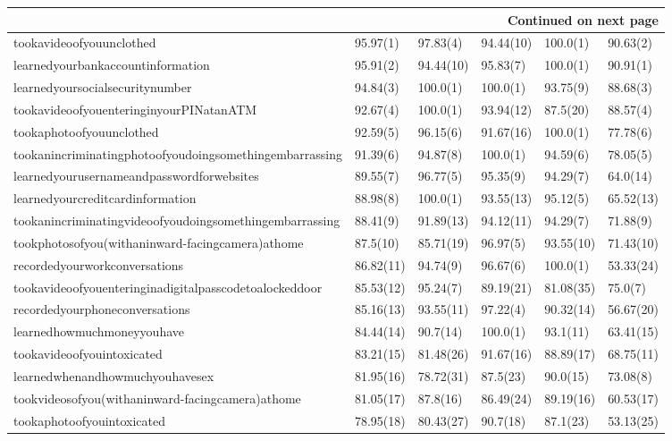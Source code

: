 \documentclass[a4paper,12pt]{article}
\begin{document}
\begin{longtable}{| p{7cm} | l | l | l | l | l |}
\hline \multicolumn{6}{|r|}{{Continued on next page}} \\ \hline
\endfoot
\hline 
\endlastfoot
tookavideoofyouunclothed & 95.97(1) & 97.83(4) & 94.44(10) & 100.0(1) & 90.63(2) \\ 
learnedyourbankaccountinformation & 95.91(2) & 94.44(10) & 95.83(7) & 100.0(1) & 90.91(1) \\ 
learnedyoursocialsecuritynumber & 94.84(3) & 100.0(1) & 100.0(1) & 93.75(9) & 88.68(3) \\ 
tookavideoofyouenteringinyourPINatanATM & 92.67(4) & 100.0(1) & 93.94(12) & 87.5(20) & 88.57(4) \\ 
tookaphotoofyouunclothed & 92.59(5) & 96.15(6) & 91.67(16) & 100.0(1) & 77.78(6) \\ 
tookanincriminatingphotoofyoudoingsomethingembarrassing & 91.39(6) & 94.87(8) & 100.0(1) & 94.59(6) & 78.05(5) \\ 
learnedyourusernameandpasswordforwebsites & 89.55(7) & 96.77(5) & 95.35(9) & 94.29(7) & 64.0(14) \\ 
learnedyourcreditcardinformation & 88.98(8) & 100.0(1) & 93.55(13) & 95.12(5) & 65.52(13) \\ 
tookanincriminatingvideoofyoudoingsomethingembarrassing & 88.41(9) & 91.89(13) & 94.12(11) & 94.29(7) & 71.88(9) \\ 
tookphotosofyou(withaninward-facingcamera)athome & 87.5(10) & 85.71(19) & 96.97(5) & 93.55(10) & 71.43(10) \\ 
recordedyourworkconversations & 86.82(11) & 94.74(9) & 96.67(6) & 100.0(1) & 53.33(24) \\ 
tookavideoofyouenteringinadigitalpasscodetoalockeddoor & 85.53(12) & 95.24(7) & 89.19(21) & 81.08(35) & 75.0(7) \\ 
recordedyourphoneconversations & 85.16(13) & 93.55(11) & 97.22(4) & 90.32(14) & 56.67(20) \\ 
learnedhowmuchmoneyyouhave & 84.44(14) & 90.7(14) & 100.0(1) & 93.1(11) & 63.41(15) \\ 
tookavideoofyouintoxicated & 83.21(15) & 81.48(26) & 91.67(16) & 88.89(17) & 68.75(11) \\ 
learnedwhenandhowmuchyouhavesex & 81.95(16) & 78.72(31) & 87.5(23) & 90.0(15) & 73.08(8) \\ 
tookvideosofyou(withaninward-facingcamera)athome & 81.05(17) & 87.8(16) & 86.49(24) & 89.19(16) & 60.53(17) \\ 
tookaphotoofyouintoxicated & 78.95(18) & 80.43(27) & 90.7(18) & 87.1(23) & 53.13(25) \\ 

\end{longtable}
\end{document}

